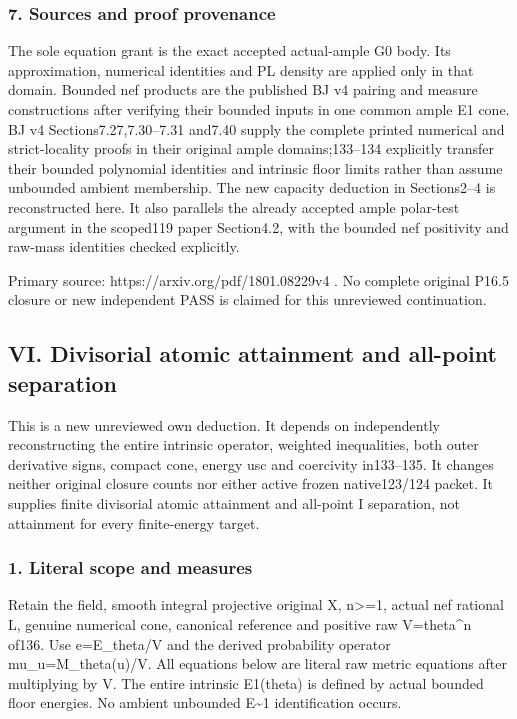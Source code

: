 \documentclass[
]{article}
\begin{document}
\subsubsection{7. Sources and proof
provenance}\label{sources-and-proof-provenance}

The sole equation grant is the exact accepted actual-ample G0 body. Its
approximation, numerical identities and PL density are applied only in
that domain. Bounded nef products are the published BJ v4 pairing and
measure constructions after verifying their bounded inputs in one common
ample E1 cone. BJ v4 Sections7.27,7.30--7.31 and7.40 supply the complete
printed numerical and strict-locality proofs in their original ample
domains;133--134 explicitly transfer their bounded polynomial identities
and intrinsic floor limits rather than assume unbounded ambient
membership. The new capacity deduction in Sections2--4 is reconstructed
here. It also parallels the already accepted ample polar-test argument
in the scoped119 paper Section4.2, with the bounded nef positivity and
raw-mass identities checked explicitly.

Primary source: https://arxiv.org/pdf/1801.08229v4 . No complete
original P16.5 closure or new independent PASS is claimed for this
unreviewed continuation.

\subsection{VI. Divisorial atomic attainment and all-point
separation}\label{vi.-divisorial-atomic-attainment-and-all-point-separation}

This is a new unreviewed own deduction. It depends on independently
reconstructing the entire intrinsic operator, weighted inequalities,
both outer derivative signs, compact cone, energy usc and coercivity
in133--135. It changes neither original closure counts nor either active
frozen native123/124 packet. It supplies finite divisorial atomic
attainment and all-point I separation, not attainment for every
finite-energy target.

\subsubsection{1. Literal scope and
measures}\label{literal-scope-and-measures}

Retain the field, smooth integral projective original X,
n\textgreater=1, actual nef rational L, genuine numerical cone,
canonical reference and positive raw V=theta\^{}n of136. Use
e=E\_theta/V and the derived probability operator mu\_u=M\_theta(u)/V.
All equations below are literal raw metric equations after multiplying
by V. The entire intrinsic E1(theta) is defined by actual bounded floor
energies. No ambient unbounded E\textasciitilde1 identification occurs.
\end{document}
